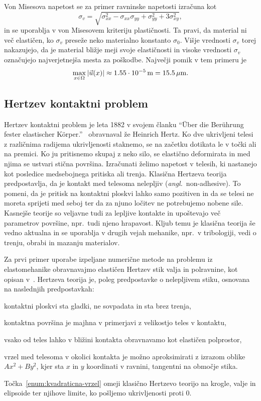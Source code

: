 \documentclass[12pt,a4paper,twoside]{article}
\newenvironment{enumerate*}{\vspace{-1.5\parskip}\begin{enumerate}\setlength{\itemsep}{0pt}\setlength{\parskip}{2pt}}{\end{enumerate}\vspace{-1\parskip}}
\theoremstyle{definition} %
\theoremstyle{plain} %
\numberwithin{equation}{section}
\newcommand{\vu}{\vec{u}}
\newcommand{\ts}{\sigma}
\newcommand{\ang}[1]{(\hspace{-1.5px}\textit{angl.}\ #1)}
\begin{document}
Von Misesova napetost se za primer ravninske napetosti
izračuna kot
\begin{equation}
  \sigma_v = \sqrt{\sigma_{xx}^2-\sigma_{xx}\sigma_{yy}+\sigma_{yy}^2+3\sigma_{xy}^2},
\end{equation}
in se uporablja v von Misesovem kriteriju plastičnosti. Ta pravi, da material ni več
elastičen, ko $\sigma_v$ preseže neko materialno konstanto $\sigma_0$. Višje vrednosti $\ts_v$
torej nakazujejo, da je material bližje meji svoje elastičnosti in visoke vrednosti $\ts_v$
označujejo najverjetnejša mesta za poškodbe. Največji pomik v tem primeru je
\begin{equation}
  \max_{x \in \Omega} |\vu(x)| \approx \unit[1.55 \cdot 10^{-5}]{m} = \unit[15.5]{\mu m}.
\end{equation}

\subsection{Hertzev kontaktni problem}
\label{sec:hertz}
Hertzev kontaktni problem je leta 1882 v svojem članku ``{\"U}ber die Ber{\"u}hrung fester
elastischer K{\"o}rper.''~\cite{hertz1882beruhrung} obravnaval že Heinrich Hertz. Ko dve ukrivljeni
telesi z različnima radijema ukrivljenosti staknemo, se na začetku dotikata le v točki ali na
premici. Ko ju pritisnemo skupaj z neko silo, se elastično deformirata in med njima se ustvari
stična površina. Izračunati želimo napetost v telesih, ki nastanejo kot posledice medsebojnega
pritiska ali trenja. Klasična Hertzeva teorija predpostavlja, da je kontakt med telesoma nelepljiv
\ang{non-adhesive}. To pomeni, da je pritisk na kontaktni ploskvi lahko samo pozitiven in da se
telesi ne moreta sprijeti med seboj ter da za njuno ločitev ne potrebujemo nobene sile. Kasnejše
teorije so veljavne tudi za lepljive kontakte in upoštevajo več parametrov površine, npr.~tudi njeno
hrapavost. Kljub temu je klasična teorija še vedno aktualna in se uporablja v drugih vejah mehanike,
npr.~v tribologiji, vedi o trenju, obrabi in mazanju materialov.

Za prvi primer uporabe izpeljane numerične metode na problemu iz elastomehanike obravnavajmo
elastičen Hertzev stik valja in polravnine, kot opisan v~\cite[str.\ 122, poglavje 3.2]{williams2001contact}.
Hertzeva teorija je, poleg predpostavke o nelepljivem stiku, osnovana na naslednjih predpostavkah:
\begin{enumerate*}
  \item kontaktni ploskvi sta gladki, ne sovpadata in sta brez trenja,
  \item kontaktna površina je majhna v primerjavi z velikostjo teles v kontaktu,
  \item vsako od teles lahko v bližini kontakta obravnavamo kot elastičen polprostor,
  \item vrzel med telesoma v okolici kontakta je možno aproksimirati z izrazom oblike $Ax^2 + By^2$,
    kjer sta $x$ in $y$ koordinati v ravnini, tangentni na območje stika.
    \label{enum:kvadraticna-vrzel}
\end{enumerate*}
Točka~\ref{enum:kvadraticna-vrzel} omeji klasično Hertzevo teorijo na krogle, valje in elipsoide ter
njihove limite, ko pošljemo ukrivljenosti proti 0.
\end{document}
